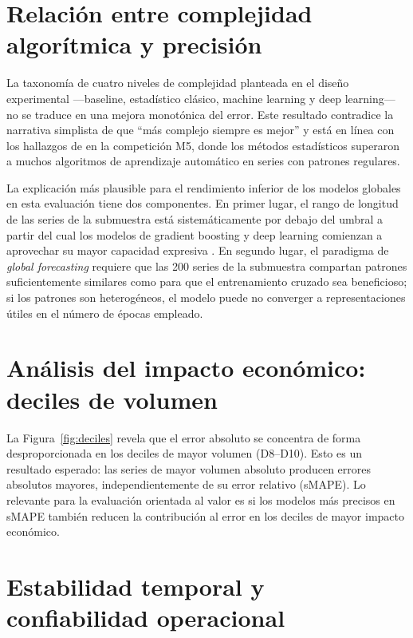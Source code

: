 \section{Relación entre complejidad algorítmica y precisión}
\label{sec:complejidad_precision}

La taxonomía de cuatro niveles de complejidad planteada en el diseño experimental ---baseline, estadístico clásico, machine learning y deep learning--- no se traduce en una mejora monotónica del error. Este resultado contradice la narrativa simplista de que ``más complejo siempre es mejor'' y está en línea con los hallazgos de \textcite{Makridakis2022} en la competición M5, donde los métodos estadísticos superaron a muchos algoritmos de aprendizaje automático en series con patrones regulares.

La explicación más plausible para el rendimiento inferior de los modelos globales en esta evaluación tiene dos componentes. En primer lugar, el rango de longitud de las series de la submuestra está sistemáticamente por debajo del umbral a partir del cual los modelos de gradient boosting y deep learning comienzan a aprovechar su mayor capacidad expresiva \parencite{Cerqueira2022}. En segundo lugar, el paradigma de \textit{global forecasting} requiere que las 200 series de la submuestra compartan patrones suficientemente similares como para que el entrenamiento cruzado sea beneficioso; si los patrones son heterogéneos, el modelo puede no converger a representaciones útiles en el número de épocas empleado.

\section{Análisis del impacto económico: deciles de volumen}
\label{sec:analisis_economico}

La Figura~\ref{fig:deciles} revela que el error absoluto se concentra de forma desproporcionada en los deciles de mayor volumen (D8--D10). Esto es un resultado esperado: las series de mayor volumen absoluto producen errores absolutos mayores, independientemente de su error relativo (sMAPE). Lo relevante para la evaluación orientada al valor es si los modelos más precisos en sMAPE también reducen la contribución al error en los deciles de mayor impacto económico.

\section{Estabilidad temporal y confiabilidad operacional}
\label{sec:estabilidad_operacional}

